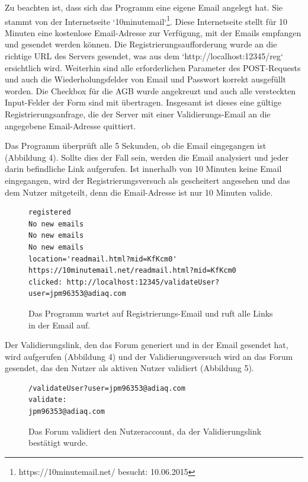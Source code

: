 Zu beachten ist, dass sich das Programm eine eigene Email angelegt hat. Sie stammt von der Internetseite `10minutemail`\footnote{https://10minutemail.net/ besucht: 10.06.2015}.
Diese Internetseite stellt für 10 Minuten eine kostenlose Email-Adresse zur Verfügung, mit der Emails empfangen und gesendet werden können. Die Registrierungsaufforderung wurde an die richtige URL des Servers gesendet, was aus dem `http://localhost:12345/reg` ersichtlich wird. Weiterhin sind alle erforderlichen Parameter des POST-Requests und auch die Wiederholungsfelder von Email und Passwort korrekt ausgefüllt worden. Die Checkbox für die AGB wurde angekreuzt und auch alle versteckten Input-Felder der Form sind mit übertragen. Insgesamt ist dieses eine gültige Registrierungsanfrage, die der Server mit einer Validierungs-Email an die angegebene Email-Adresse quittiert.

Das Programm überprüft alle 5 Sekunden, ob die Email eingegangen ist (Abbildung 4). Sollte dies der Fall sein, werden die Email analysiert und jeder darin befindliche Link aufgerufen. Ist innerhalb von 10 Minuten keine Email eingegangen, wird der Registrierungsversuch als gescheitert angesehen und das dem Nutzer mitgeteilt, denn die Email-Adresse ist nur 10 Minuten valide.

\begin{figure}[ht]
\begin{lstlisting}[language=HTML5]
registered
No new emails
No new emails
No new emails
location='readmail.html?mid=KfKcm0'
https://10minutemail.net/readmail.html?mid=KfKcm0
clicked: http://localhost:12345/validateUser?user=jpm96353@adiaq.com
\end{lstlisting}
\caption{Das Programm wartet auf Registrierungs-Email und ruft alle Links in der Email auf.}
\end{figure}

Der Validierungslink, den das Forum generiert und in der Email gesendet hat, wird aufgerufen (Abbildung 4) und der Validierungsversuch wird an das Forum gesendet, das den Nutzer als aktiven Nutzer validiert (Abbildung 5).

\begin{figure}[ht]
\begin{lstlisting}[language=HTML5]
/validateUser?user=jpm96353@adiaq.com
validate:
jpm96353@adiaq.com
\end{lstlisting}
\caption{Das Forum validiert den Nutzeraccount, da der Validierungslink bestätigt wurde.}
\end{figure}


